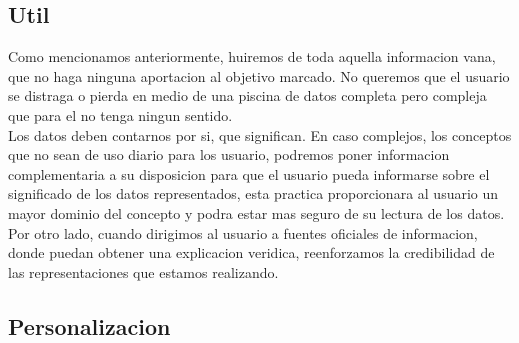\subsection{Util}
Como mencionamos anteriormente, huiremos de toda aquella informacion vana, que no haga ninguna aportacion
al objetivo marcado. No queremos que el usuario se distraga o pierda en medio de una piscina de datos completa
pero compleja que para el no tenga ningun sentido.\\

Los datos deben contarnos por si, que significan.
En caso complejos, los conceptos que no sean de uso diario para los usuario, podremos poner informacion
complementaria a su disposicion para que el usuario pueda informarse sobre el significado de los datos 
representados, esta practica proporcionara al usuario un mayor dominio del concepto y podra estar mas
seguro de su lectura de los datos.
Por otro lado, cuando dirigimos al usuario a fuentes oficiales de informacion, donde puedan obtener una explicacion veridica,
reenforzamos la credibilidad de las representaciones que estamos realizando.

\subsection{Personalizacion}
\begin{comment}
--relevante de manera general vs relevante personal
--casos personales
--aplicabilidad
--solventar problema en particular



\begin{itemize}

      \item Herramientas necesarias para que el usuario entienda la informacion y de porque
 \item conocimientos multidisciplinares
    \item fuentes fiables, actualizacion periodica
\end{itemize}
\end{comment}